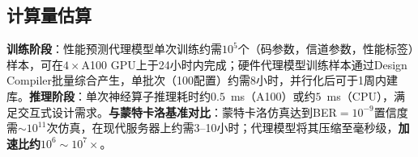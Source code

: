 \subsection{计算量估算}

\textbf{训练阶段}：性能预测代理模型单次训练约需$10^5$个（码参数，信道参数，性能标签）样本，可在$4\times$A100 GPU上于24小时内完成；硬件代理模型训练样本通过Design Compiler批量综合产生，单批次（100配置）约需8小时，并行化后可于1周内建库。\textbf{推理阶段}：单次神经算子推理耗时约$0.5$~ms（A100）或约$5$~ms（CPU），满足交互式设计需求。\textbf{与蒙特卡洛基准对比}：蒙特卡洛仿真达到BER$=10^{-9}$置信度需$\sim10^{11}$次仿真，在现代服务器上约需3--10小时；代理模型将其压缩至毫秒级，\textbf{加速比约$10^6\sim10^7\times$}。